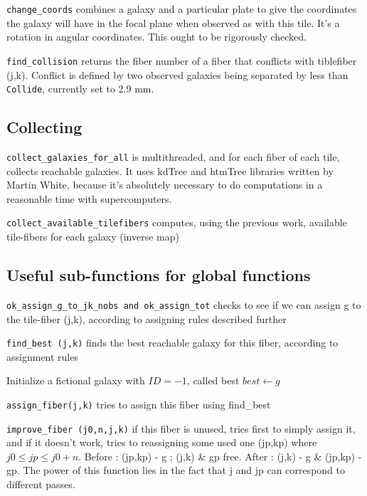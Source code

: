 \documentclass{extarticle}
\begin{document}
{\tt change\_coords} combines a galaxy and a particular plate to give the coordinates the galaxy will have in the focal plane when observed as with this tile. It's a rotation in angular coordinates. This ought to be rigorously checked.

{\tt find\_collision} returns the fiber number of a fiber that conflicts with tiblefiber (j,k).  Conflict is defined by two observed galaxies being separated by less than {\tt Collide}, currently set to 2.9 mm.

\subsection{Collecting}
{\tt collect\_galaxies\_for\_all} is multithreaded, and for each fiber of each tile, collects reachable galaxies. It uses kdTree and htmTree libraries written by Martin White, because it's absolutely necessary to do computations in a reasonable time with supercomputers.

{\tt collect\_available\_tilefibers} computes, using the previous work, available tile-fibers for each galaxy (inverse map)

\subsection{Useful sub-functions for global functions}

{\tt ok\_assign\_g\_to\_jk\_nobs and ok\_assign\_tot} checks to see if we can assign g to the tile-fiber (j,k), according to assigning rules described further

{\tt find\_best (j,k)} finds the best reachable galaxy for this fiber, according to assignment rules

\begin{algorithm}[H]
	\caption{Find best(j,k)}\label{euclid}
	\begin{algorithmic}[1]
		\State Initialize a fictional galaxy with $ID=-1$, called best
		\State $best \gets g$
		\EndIf
		\EndFor
	\end{algorithmic}
\end{algorithm}

{\tt assign\_fiber(j,k)} tries to assign this fiber using find\_best

{\tt improve\_fiber (j0,n,j,k)} if this fiber is unused, tries first to simply assign it, and if it doesn't work, tries to reassigning some used one (jp,kp) where $j0\le jp \le j0+n$. Before : (jp,kp) - g ; (j,k) \& gp free. After : (j,k) - g \& (jp,kp) - gp. The power of this function lies in the fact that j and jp can correspond to different passes.
\end{document}
